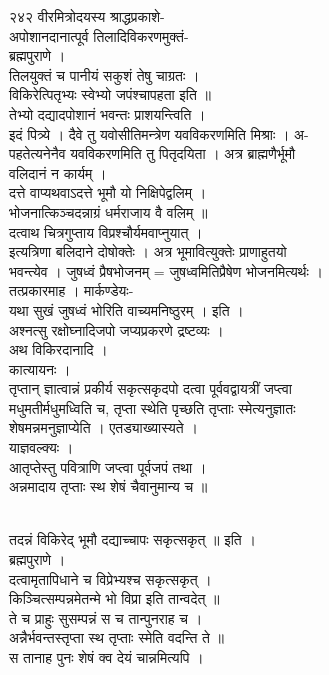 \documentclass[11pt, openany]{book}
\begin{document}
{२४२ वीरमित्रोदयस्य श्राद्धप्रकाशे-}{\\
अपोशानदानात्पूर्व तिलादिविकरणमुक्तं-\\
ब्रह्मपुराणे ।\\
तिलयुक्तं च पानीयं सकुशं तेषु चाग्रतः ।\\
विकिरेत्पितृभ्यः स्वेभ्यो जपंश्चापहता इति ॥\\
तेभ्यो दद्यादपोशानं भवन्तः प्राशयन्त्विति ।\\
इदं पित्र्ये । दैवे तु यवोसीतिमन्त्रेण यवविकरणमिति मिश्राः । अ-\\
पहतेत्यनेनैव यवविकरणमिति तु पितृदयिता । अत्र ब्राह्मणैर्भूमौ\\
वलिदानं न कार्यम् ।\\
दत्ते वाप्यथवाऽदत्ते भूमौ यो निक्षिपेद्वलिम् ।\\
भोजनात्किञ्चदन्नाग्रं धर्मराजाय वै वलिम् ॥\\
दत्वाथ चित्रगुप्ताय विप्रश्चौर्यमवाप्नुयात् ।\\
इत्यत्रिणा बलिदाने दोषोक्तेः । अत्र भूमावित्युक्तेः प्राणाहुतयो\\
भवन्त्येव । जुषध्वं प्रैषभोजनम् = जुषध्वमितिप्रैषेण भोजनमित्यर्थः ।\\
तत्प्रकारमाह । मार्कण्डेयः-\\
यथा सुखं जुषध्वं भोरिति वाच्यमनिष्ठुरम् । इति ।\\
अश्नत्सु रक्षोघ्नादिजपो जप्यप्रकरणे द्रष्टव्यः ।\\
अथ विकिरदानादि ।\\
कात्यायनः ।\\
तृप्तान् ज्ञात्वान्नं प्रकीर्य सकृत्सकृदपो दत्वा पूर्ववद्वायत्रीं
जप्त्वा\\
मधुमतीर्मधुमध्विति च, तृप्ता स्थेति पृच्छति तृप्ताः स्मेत्यनुज्ञातः\\
शेषमन्नमनुज्ञाप्येति । एतड्याख्यास्यते ।\\
याज्ञवल्क्यः ।\\
आतृप्तेस्तु पवित्राणि जप्त्वा पूर्वजपं तथा ।\\
अन्नमादाय तृप्ताः स्थ शेषं चैवानुमान्य च }{॥}{\\
तदन्नं विकिरेद् भूमौ दद्याच्चापः सकृत्सकृत् ॥ इति ।\\
ब्रह्मपुराणे ।\\
दत्वामृतापिधाने च विप्रेभ्यश्च सकृत्सकृत् ।\\
किञ्चित्सम्पन्नमेतन्मे भो विप्रा इति तान्वदेत् ॥\\
ते च प्राहुः सुसम्पन्नं स च तान्पुनराह च ।\\
अन्नैर्भवन्तस्तृप्ता स्थ तृप्ताः स्मेति वदन्ति ते ॥\\
स तानाह पुनः शेषं क्व देयं चान्नमित्यपि ।

}
\end{document}
